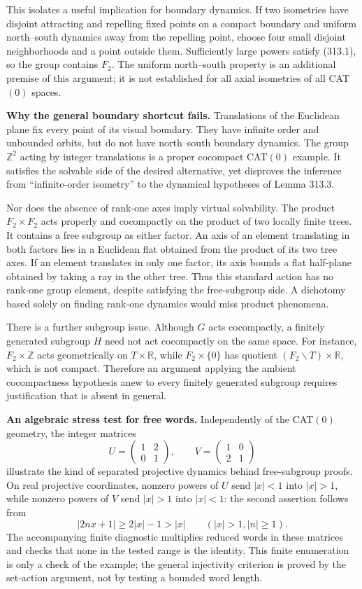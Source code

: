 \documentclass[11pt]{article}
\begin{document}
This isolates a useful implication for boundary dynamics. If two isometries have disjoint attracting and repelling fixed points on a compact boundary and uniform north--south dynamics away from the repelling point, choose four small disjoint neighborhoods and a point outside them. Sufficiently large powers satisfy (313.1), so the group contains $F_2$. The uniform north--south property is an additional premise of this argument; it is not established for all axial isometries of all CAT$(0)$ spaces.

\textbf{Why the general boundary shortcut fails.} Translations of the Euclidean plane fix every point of its visual boundary. They have infinite order and unbounded orbits, but do not have north--south boundary dynamics. The group $\mathbb Z^2$ acting by integer translations is a proper cocompact CAT$(0)$ example. It satisfies the solvable side of the desired alternative, yet disproves the inference from ``infinite-order isometry'' to the dynamical hypotheses of Lemma 313.3.

Nor does the absence of rank-one axes imply virtual solvability. The product $F_2\times F_2$ acts properly and cocompactly on the product of two locally finite trees. It contains a free subgroup as either factor. An axis of an element translating in both factors lies in a Euclidean flat obtained from the product of its two tree axes. If an element translates in only one factor, its axis bounds a flat half-plane obtained by taking a ray in the other tree. Thus this standard action has no rank-one group element, despite satisfying the free-subgroup side. A dichotomy based solely on finding rank-one dynamics would miss product phenomena.

There is a further subgroup issue. Although $G$ acts cocompactly, a finitely generated subgroup $H$ need not act cocompactly on the same space. For instance, $F_2\times\mathbb Z$ acts geometrically on $T\times\mathbb R$, while $F_2\times\{0\}$ has quotient $(F_2\backslash T)\times\mathbb R$, which is not compact. Therefore an argument applying the ambient cocompactness hypothesis anew to every finitely generated subgroup requires justification that is absent in general.

\textbf{An algebraic stress test for free words.} Independently of the CAT$(0)$ geometry, the integer matrices
\[
 U=\begin{pmatrix}1&2\\0&1\end{pmatrix},\qquad
 V=\begin{pmatrix}1&0\\2&1\end{pmatrix}
\]
illustrate the kind of separated projective dynamics behind free-subgroup proofs. On real projective coordinates, nonzero powers of $U$ send $|x|<1$ into $|x|>1$, while nonzero powers of $V$ send $|x|>1$ into $|x|<1$: the second assertion follows from
\[
 |2nx+1|\geq2|x|-1>|x|\qquad(|x|>1, |n|\geq1).
\]
The accompanying finite diagnostic multiplies reduced words in these matrices and checks that none in the tested range is the identity. This finite enumeration is only a check of the example; the general injectivity criterion is proved by the set-action argument, not by testing a bounded word length.
\end{document}
